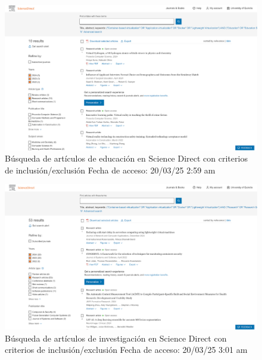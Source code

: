 \FloatBarrier\begin{figure}[htbp]
    \centering
    \includegraphics[width=\textwidth,keepaspectratio]{apendices/BD/criterios/SD-ed.png}
    \caption{Búsqueda de artículos de educación en Science Direct con criterios de inclusión/exclusión
    Fecha de acceso: 20/03/25 2:59 am
    }\label{fig:busqueda25}
\end{figure}
\FloatBarrier\begin{figure}[htbp]
    \centering
    \includegraphics[width=\textwidth,keepaspectratio]{apendices/BD/criterios/SD-inv.png}
    \caption{Búsqueda de artículos de investigación en Science Direct con criterios de inclusión/exclusión
    Fecha de acceso: 20/03/25 3:01 am
    }\label{fig:busqueda26}
\end{figure}
